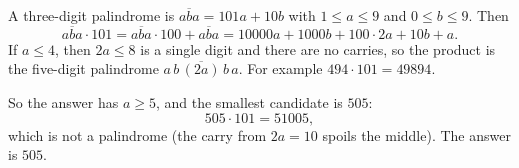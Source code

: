 A three-digit palindrome is $\overline{aba}=101a+10b$ with $1\le a\le9$ and $0\le b\le9$. Then
\[\overline{aba}\cdot101=\overline{aba}\cdot100+\overline{aba}=10000a+1000b+100\cdot2a+10b+a .\]
If $a\le4$, then $2a\le8$ is a single digit and there are no carries, so the product is the five-digit palindrome $\overline{a\,b\,(2a)\,b\,a}$. For example $494\cdot101=49894$.

So the answer has $a\ge5$, and the smallest candidate is $505$:
\[505\cdot101=51005,\]
which is not a palindrome (the carry from $2a=10$ spoils the middle). The answer is $\boxed{505}$.
